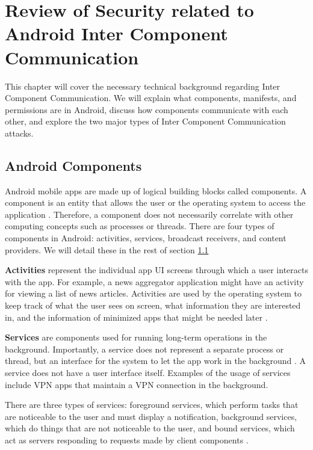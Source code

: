 \chapter{Review of Security related to Android Inter Component Communication}
    \label{chap:background}

   This chapter will cover the necessary technical background regarding Inter Component Communication. We will explain what components, manifests, and permissions are in Android, discuss how components communicate with each other, and explore the two major types of Inter Component Communication attacks.
    
    \section{Android Components}
        \label{sec:android_components}
        
    Android mobile apps are made up of logical building blocks called components. A component is an entity that allows the user or the operating system to access the application \cite{android_app_fundamentals}. Therefore, a component does not necessarily correlate with other computing concepts such as processes or threads. There are four types of components in Android: activities, services, broadcast receivers, and content providers. We will detail these in the rest of section \ref{sec:android_components}
        
    \textbf{Activities} represent the individual app UI screens through which a user interacts with the app. For example, a news aggregator application might have an activity for viewing a list of news articles. Activities are used by the operating system to keep track of what the user sees on screen, what information they are interested in, and the information of minimized apps that might be needed later \cite{android_app_fundamentals}.
        
    \textbf{Services} are components used for running long-term operations in the background. Importantly, a service does not represent a separate process or thread, but an interface for the system to let the app work in the background \cite{whats_is_a_service}. A service does not have a user interface itself. Examples of the usage of services include VPN apps that maintain a VPN connection in the background.
    
    There are three types of services: foreground services, which perform tasks that are noticeable to the user and must display a notification, background services, which do things that are not noticeable to the user, and bound services, which act as servers responding to requests made by client components \cite{services_overview}.
        
